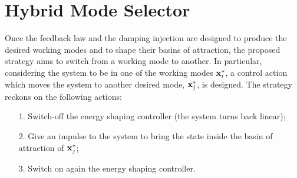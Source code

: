 \section{Hybrid Mode Selector}
%
Once the feedback law and the damping injection are designed to produce the desired working modes and to shape their basins of attraction, the proposed strategy aims to switch from a working mode to another.
In particular, considering the system to be in one of the working modes $\mathbf{x}_i^*$, a control action which moves the system to another desired mode, $\mathbf{x}_j^*$, is designed.
The strategy reckons on the following actions:
\begin{itemize}
    \item [1.] Switch-off the energy shaping controller (the system turns back linear);
    \item [2.] Give an impulse to the system to bring the state inside the basin of attraction of $\mathbf{x}_j^*$;
    \item [3.] Switch on again the energy shaping controller.
\end{itemize}
%
